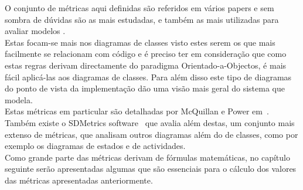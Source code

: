 O conjunto de métricas aqui definidas são referidos em vários papers e sem sombra de dúvidas são as mais estudadas, e também as mais utilizadas para avaliar modelos \uml.\\
Estas focam-se mais nos diagramas de classes visto estes serem os que mais facilmente se relacionam com código e é preciso ter em consideração que como estas regras derivam 
directamente do paradigma Orientado-a-Objectos, é mais fácil aplicá-las aos diagramas de classes. Para além disso este tipo de diagramas do ponto de vista da implementação 
dão uma visão mais geral do sistema que modela.\\
Estas métricas em particular são detalhadas por McQuillan e Power em~\cite{Power}. Também existe o SDMetrics software~\cite{SDMetrics} que avalia além destas, um conjunto
 mais extenso de métricas, que analisam outros diagramas além do de classes, como por exemplo os diagramas de estados e de actividades. \\ 
Como grande parte das métricas derivam de fórmulas matemáticas, no capítulo seguinte serão apresentadas algumas que são essenciais para o cálculo dos
valores das métricas apresentadas anteriormente.
